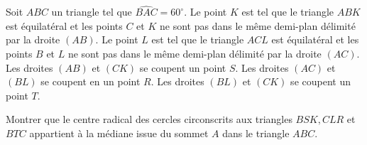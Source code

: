 Soit $ABC$ un triangle tel que $\widehat{BAC}=60^\circ$. Le point $K$ est tel que le triangle $ABK$ est équilatéral et les points $C$ et $K$ ne sont pas dans le même demi-plan délimité par la droite $(AB)$. Le point $L$ est tel que le triangle $ACL$ est équilatéral et les points $B$ et $L$ ne sont pas dans le même demi-plan délimité par la droite $(AC)$. Les droites $(AB)$ et $(CK)$ se coupent un point $S$. Les droites $(AC)$ et $(BL)$ se coupent en un point $R$. Les droites $(BL)$ et $(CK)$ se coupent un point $T$.

Montrer que le centre radical des cercles circonscrits aux triangles $BSK, CLR$ et $BTC$ appartient à la médiane issue du sommet $A$ dans le triangle $ABC$.